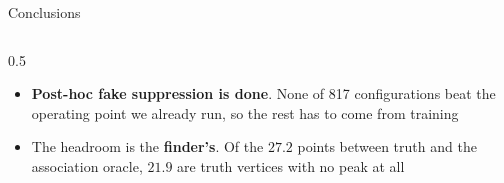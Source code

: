 \documentclass[xcolor=table,aspectratio=169]{beamer}
\begin{document}
\begin{frame}{Conclusions}
\begin{columns}[t]
\begin{column}{0.5\linewidth}
\begin{itemize}
                    ${\sim}17\%$ of adjacent PU200 vertices are closer than the
                    resolution
                \item \small \textbf{Post-hoc fake suppression is done}. None of 817
                    configurations beat the operating point we already run, so the rest
                    has to come from training
                \item \small The headroom is the \textbf{finder's}. Of the $27.2$
                    points between truth and the association oracle, $21.9$ are truth
                    vertices with no peak at all
            \end{itemize}
        \end{column}
    \end{columns}
\end{frame}
\end{document}
